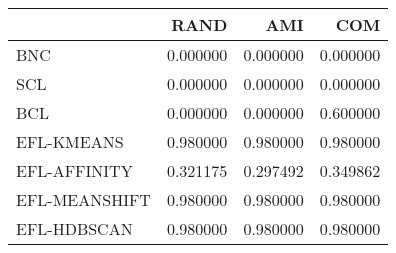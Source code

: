 \begin{tabular}{lrrr}
\toprule
 & RAND & AMI & COM \\
\midrule
BNC & 0.000000 & 0.000000 & 0.000000 \\
SCL & 0.000000 & 0.000000 & 0.000000 \\
BCL & 0.000000 & 0.000000 & 0.600000 \\
EFL-KMEANS & 0.980000 & 0.980000 & 0.980000 \\
EFL-AFFINITY & 0.321175 & 0.297492 & 0.349862 \\
EFL-MEANSHIFT & 0.980000 & 0.980000 & 0.980000 \\
EFL-HDBSCAN & 0.980000 & 0.980000 & 0.980000 \\
\bottomrule
\end{tabular}
